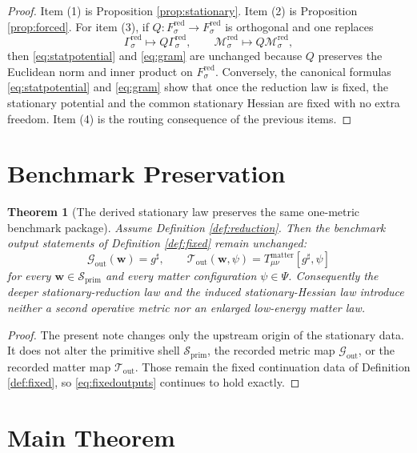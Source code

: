 \documentclass[11pt]{article}
\newcommand{\CompletedMetric}{g^{\sharp}}
\newcommand{\PrimShell}{\mathcal S_{\mathrm{prim}}}
\newcommand{\MetricOut}{\mathscr G_{\mathrm{out}}}
\newcommand{\MatterOut}{\mathscr T_{\mathrm{out}}}
\newcommand{\RedTarget}[1]{F_{#1}^{\mathrm{red}}}
\newcommand{\RedMap}[1]{\Gamma_{#1}^{\mathrm{red}}}
\newcommand{\RedLin}[1]{\mathcal M_{#1}^{\mathrm{red}}}
\newtheorem{theorem}{Theorem}
\begin{document}
\begin{proof}
Item (1) is Proposition \ref{prop:stationary}. Item (2) is Proposition \ref{prop:forced}. For item (3), if \(Q:\RedTarget{\sigma}\to\RedTarget{\sigma}\) is orthogonal and one replaces
\[
\RedMap{\sigma}\mapsto Q\RedMap{\sigma},
\qquad
\RedLin{\sigma}\mapsto Q\RedLin{\sigma},
\]
then \eqref{eq:statpotential} and \eqref{eq:gram} are unchanged because \(Q\) preserves the Euclidean norm and inner product on \(\RedTarget{\sigma}\). Conversely, the canonical formulas \eqref{eq:statpotential} and \eqref{eq:gram} show that once the reduction law is fixed, the stationary potential and the common stationary Hessian are fixed with no extra freedom. Item (4) is the routing consequence of the previous items.
\end{proof}

\section{Benchmark Preservation}

\begin{theorem}[The derived stationary law preserves the same one-metric benchmark package]
\label{thm:outputs}
Assume Definition \ref{def:reduction}. Then the benchmark output statements of Definition \ref{def:fixed} remain unchanged:
\[
\MetricOut(\mathbf w)=\CompletedMetric,
\qquad
\MatterOut(\mathbf w,\psi)
=
T_{\mu\nu}^{\mathrm{matter}}[\CompletedMetric,\psi]
\]
for every \(\mathbf w\in\PrimShell\) and every matter configuration \(\psi\in\Psi\). Consequently the deeper stationary-reduction law and the induced stationary-Hessian law introduce neither a second operative metric nor an enlarged low-energy matter law.
\end{theorem}

\begin{proof}
The present note changes only the upstream origin of the stationary data. It does not alter the primitive shell \(\PrimShell\), the recorded metric map \(\MetricOut\), or the recorded matter map \(\MatterOut\). Those remain the fixed continuation data of Definition \ref{def:fixed}, so \eqref{eq:fixedoutputs} continues to hold exactly.
\end{proof}

\section{Main Theorem}
\end{document}
